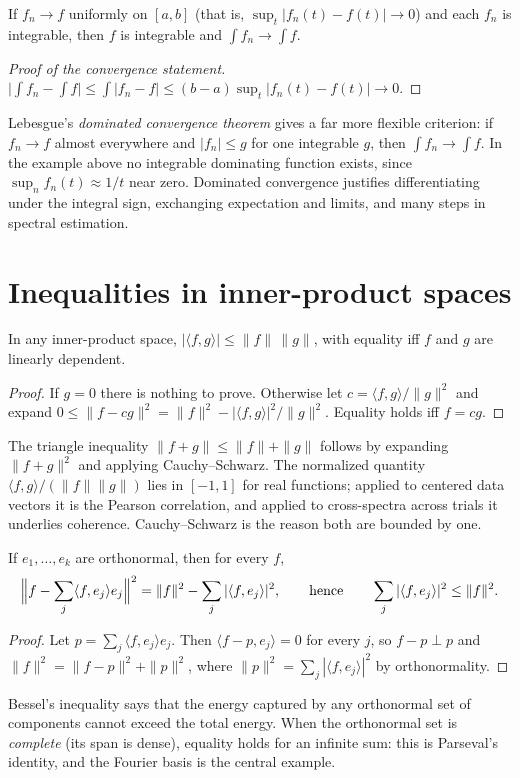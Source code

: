 \begin{theorem}
If $f_n\to f$ uniformly on $[a,b]$ (that is, $\sup_t|f_n(t)-f(t)|\to0$) and each $f_n$ is integrable, then $f$ is integrable and $\int f_n\to\int f$.
\end{theorem}
\begin{proof}[Proof of the convergence statement]
$\bigl|\int f_n-\int f\bigr|\le\int|f_n-f|\le(b-a)\sup_t|f_n(t)-f(t)|\to0$.
\end{proof}
Lebesgue's \emph{dominated convergence theorem} gives a far more flexible criterion: if $f_n\to f$ almost everywhere and $|f_n|\le g$ for one integrable $g$, then $\int f_n\to\int f$. In the example above no integrable dominating function exists, since $\sup_nf_n(t)\approx1/t$ near zero. Dominated convergence justifies differentiating under the integral sign, exchanging expectation and limits, and many steps in spectral estimation.

\section{Inequalities in inner-product spaces}
\begin{theorem}
In any inner-product space, $|\langle f,g\rangle|\le\|f\|\,\|g\|$, with equality iff $f$ and $g$ are linearly dependent.
\end{theorem}
\begin{proof}
If $g=0$ there is nothing to prove. Otherwise let $c=\langle f,g\rangle/\|g\|^2$ and expand $0\le\|f-cg\|^2=\|f\|^2-|\langle f,g\rangle|^2/\|g\|^2$. Equality holds iff $f=cg$.
\end{proof}
The triangle inequality $\|f+g\|\le\|f\|+\|g\|$ follows by expanding $\|f+g\|^2$ and applying Cauchy--Schwarz. The normalized quantity $\langle f,g\rangle/(\|f\|\|g\|)$ lies in $[-1,1]$ for real functions; applied to centered data vectors it is the Pearson correlation, and applied to cross-spectra across trials it underlies coherence. Cauchy--Schwarz is the reason both are bounded by one.

\begin{theorem}
If $e_1,\ldots,e_k$ are orthonormal, then for every $f$,
\[
\Bigl\|f-\sum_j\langle f,e_j\rangle e_j\Bigr\|^2=\|f\|^2-\sum_j|\langle f,e_j\rangle|^2,
\qquad\text{hence}\qquad\sum_j|\langle f,e_j\rangle|^2\le\|f\|^2.
\]
\end{theorem}
\begin{proof}
Let $p=\sum_j\langle f,e_j\rangle e_j$. Then $\langle f-p,e_j\rangle=0$ for every $j$, so $f-p\perp p$ and $\|f\|^2=\|f-p\|^2+\|p\|^2$, where $\|p\|^2=\sum_j|\langle f,e_j\rangle|^2$ by orthonormality.
\end{proof}
Bessel's inequality says that the energy captured by any orthonormal set of components cannot exceed the total energy. When the orthonormal set is \emph{complete} (its span is dense), equality holds for an infinite sum: this is Parseval's identity, and the Fourier basis is the central example.

